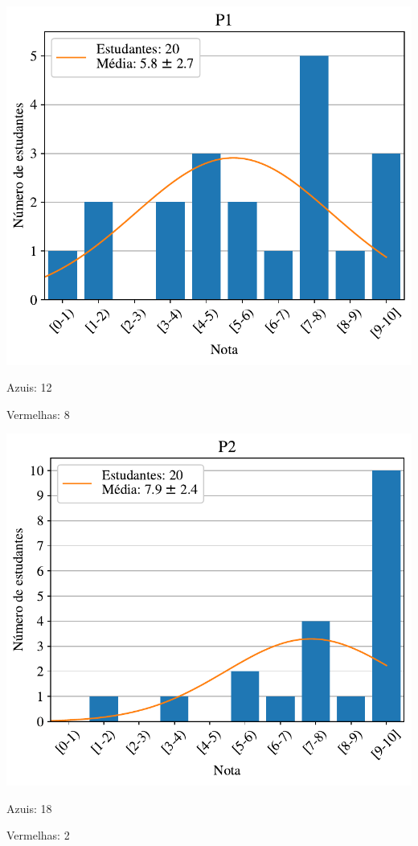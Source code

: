 \documentclass[12pt]{article}
\begin{document}
\begin{multicols}{2}
\begin{tabular}{lccc}
\hline 
\end{tabular} 

\includegraphics[width=\columnwidth]{hist-P1.pdf}
\begin{minipage}{\columnwidth}
\begin{flushright}
Azuis: 12

Vermelhas: 8 
\end{flushright}
\vskip 5mm
\end{minipage}
\includegraphics[width=\columnwidth]{hist-P2.pdf}
\begin{minipage}{\columnwidth}
\begin{flushright}
Azuis: 18

Vermelhas: 2 
\end{flushright}
\vskip 5mm
\end{minipage}
\end{multicols}
\end{document}
